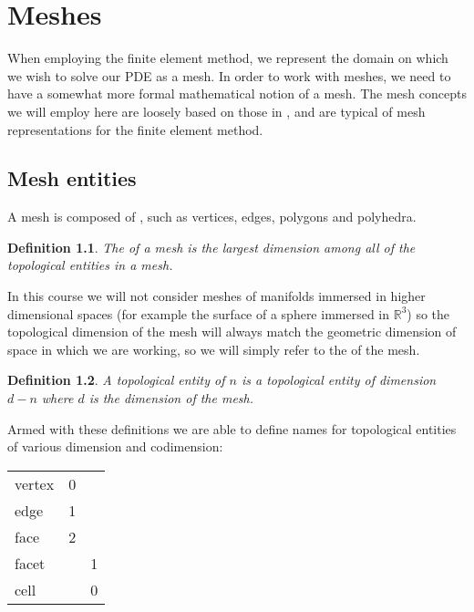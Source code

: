 \documentclass{book}
\newtheorem{definition}{Definition}
\begin{document}
\chapter{Meshes}
\label{\detokenize{3_meshes::doc}}\label{\detokenize{3_meshes:meshes}}
When employing the finite element method, we represent the domain on
which we wish to solve our PDE as a mesh. In order to work with
meshes, we need to have a somewhat more formal mathematical notion of
a mesh. The mesh concepts we will employ here are loosely based on
those in \label{\detokenize{3_meshes:id1}}{\hyperref[\detokenize{zbibliography:logg2009}]{\sphinxcrossref{{[}Log09{]}}}}, and are typical of mesh representations for the
finite element method.


\section{Mesh entities}
\label{\detokenize{3_meshes:mesh-entities}}
A mesh is composed of , such as vertices, edges,
polygons and polyhedra.

\begin{definition}
The  of a mesh is the largest
dimension among all of the topological entities in a mesh.
\end{definition}
In this course we will not consider meshes of manifolds immersed in
higher dimensional spaces (for example the surface of a sphere
immersed in \(\mathbb{R}^3\)) so the topological dimension of the
mesh will always match the geometric dimension of space in which we
are working, so we will simply refer to the  of the mesh.

\begin{definition}
A topological entity of  \(n\) is a topological
entity of dimension \(d-n\) where \(d\) is the dimension of the
mesh.
\end{definition}
Armed with these definitions we are able to define names for
topological entities of various dimension and codimension:


\begin{savenotes}\sphinxattablestart
\centering
\begin{tabulary}{\linewidth}[t]{|T|T|T|}
\hline
{}\relax &\relax &\relax \\
\hline
vertex
&
0
&\\
\hline
edge
&
1
&\\
\hline
face
&
2
&\\
\hline
facet
&&
1
\\
\hline
cell
&&
0
\\
\hline
\end{tabulary}
\par
\sphinxattableend\end{savenotes}
\end{document}
